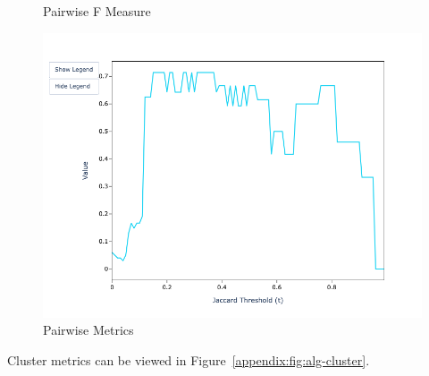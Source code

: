 \documentclass[a4paper,twoside]{article}
\begin{document}
\begin{figure}[htbp]
\begin{minipage}{0.32\textwidth}
            \caption*{Pairwise F Measure}
            \includegraphics[width=\textwidth]{sample-usage/mini-alg-pf}
        \end{minipage}
        \caption{Pairwise Metrics}\label{appendix:fig:alg-pairwise}
    \end{figure}

    Cluster metrics can be viewed in  Figure~\ref{appendix:fig:alg-cluster}.
\end{document}
